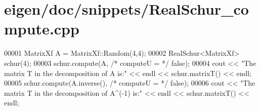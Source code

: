 \hypertarget{eigen_2doc_2snippets_2_real_schur__compute_8cpp_source}{}\section{eigen/doc/snippets/\+Real\+Schur\+\_\+compute.cpp}
\label{eigen_2doc_2snippets_2_real_schur__compute_8cpp_source}

\begin{DoxyCode}
00001 MatrixXf A = MatrixXf::Random(4,4);
00002 RealSchur<MatrixXf> schur(4);
00003 schur.compute(A, \textcolor{comment}{/* computeU = */} \textcolor{keyword}{false});
00004 cout << \textcolor{stringliteral}{"The matrix T in the decomposition of A is:"} << endl << schur.matrixT() << endl;
00005 schur.compute(A.inverse(), \textcolor{comment}{/* computeU = */} \textcolor{keyword}{false});
00006 cout << \textcolor{stringliteral}{"The matrix T in the decomposition of A^(-1) is:"} << endl << schur.matrixT() << endl;
\end{DoxyCode}
